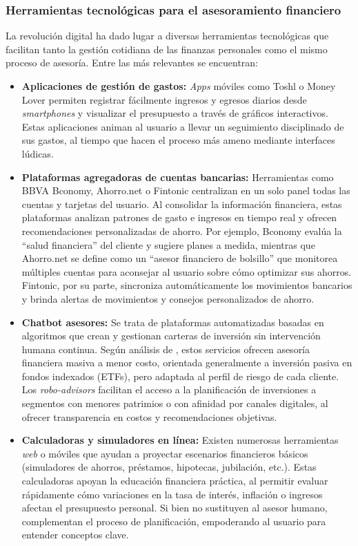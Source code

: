 {}
\subsubsection*{Herramientas tecnológicas para el asesoramiento financiero}

La revolución digital ha dado lugar a diversas herramientas tecnológicas que facilitan tanto la gestión cotidiana de las finanzas personales como el mismo proceso de asesoría. Entre las más relevantes se encuentran:

\begin{itemize}
	\item \textbf{Aplicaciones de gestión de gastos:} \textit{Apps} móviles como Toshl o Money Lover permiten registrar fácilmente ingresos y egresos diarios desde \textit{smartphones} y visualizar el presupuesto a través de gráficos interactivos. Estas aplicaciones animan al usuario a llevar un seguimiento disciplinado de sus gastos, al tiempo que hacen el proceso más ameno mediante interfaces lúdicas.
	\item \textbf{Plataformas agregadoras de cuentas bancarias:} Herramientas como BBVA Bconomy, Ahorro.net o Fintonic centralizan en un solo panel todas las cuentas y tarjetas del usuario. Al consolidar la información financiera, estas plataformas analizan patrones de gasto e ingresos en tiempo real y ofrecen recomendaciones personalizadas de ahorro. Por ejemplo, Bconomy evalúa la ``salud financiera'' del cliente y sugiere planes a medida, mientras que Ahorro.net se define como un ``asesor financiero de bolsillo'' que monitorea múltiples cuentas para aconsejar al usuario sobre cómo optimizar sus ahorros. Fintonic, por su parte, sincroniza automáticamente los movimientos bancarios y brinda alertas de movimientos y consejos personalizados de ahorro.
	
	\item \textbf{Chatbot asesores:} Se trata de plataformas automatizadas basadas en algoritmos que crean y gestionan carteras de inversión sin intervención humana continua. Según análisis de \textcite{BBVAResearch01}, estos servicios ofrecen asesoría financiera masiva a menor costo, orientada generalmente a inversión pasiva en fondos indexados (ETFs), pero adaptada al perfil de riesgo de cada cliente. Los \textit{robo-advisors} facilitan el acceso a la planificación de inversiones a segmentos con menores patrimios o con afinidad por canales digitales, al ofrecer transparencia en costos y recomendaciones objetivas.
	\item \textbf{Calculadoras y simuladores en línea:} Existen numerosas herramientas \textit{web} o móviles que ayudan a proyectar escenarios financieros básicos (simuladores de ahorros, préstamos, hipotecas, jubilación, etc.). Estas calculadoras apoyan la educación financiera práctica, al permitir evaluar rápidamente cómo variaciones en la tasa de interés, inflación o ingresos afectan el presupuesto personal. Si bien no sustituyen al asesor humano, complementan el proceso de planificación, empoderando al usuario para entender conceptos clave.
\end{itemize}

